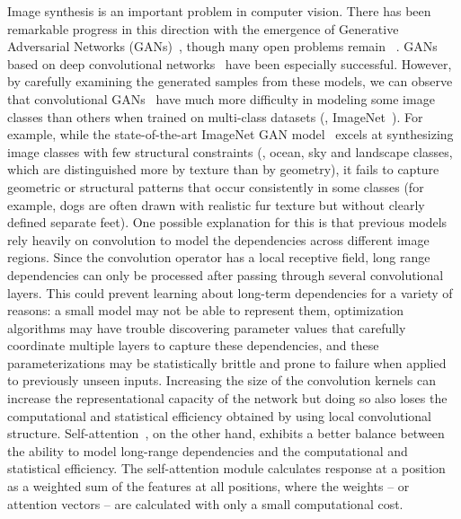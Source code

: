 \documentclass{article}
\begin{document}
Image synthesis is an important problem in computer vision. There has been remarkable progress in this direction with the emergence of Generative Adversarial Networks (GANs)~\cite{goodfellow2014generative}, though many open problems remain ~\cite{OPENPROBLEMS}. GANs based on deep convolutional networks~\cite{Radford15,KarrasALL18,Han17stackgan2} have been especially successful. However, by carefully examining the generated samples from these models, we can observe that convolutional GANs~\cite{Odena2016,Miyato18a, Miyato18b} have much more difficulty in modeling some image classes than others when trained on multi-class datasets (\eg, ImageNet~\cite{ILSVRC15}). For example, while the state-of-the-art ImageNet GAN model~\cite{Miyato18b} excels at synthesizing image classes with few structural constraints (\eg, ocean, sky and landscape classes, which are distinguished more by texture than by geometry), it fails to capture geometric or structural patterns that occur consistently in some classes (for example, dogs are often drawn with realistic fur texture but without clearly defined separate feet). One possible explanation for this is that previous models rely heavily on convolution to model the dependencies across different image regions. Since the convolution operator has a local receptive field, long range dependencies can only be processed after passing through several convolutional layers. This could prevent learning about long-term dependencies for a variety of reasons: a small model may not be able to represent them, optimization algorithms may have trouble discovering parameter values that carefully coordinate multiple layers to capture these dependencies, and these parameterizations may be statistically brittle and prone to failure when applied to previously unseen inputs. Increasing the size of the convolution kernels can increase the representational capacity of the network but doing so also loses the computational and statistical efficiency obtained by using local convolutional structure. Self-attention~\cite{Cheng16,ParikhT0U16, Ashish17}, on the other hand, exhibits a better balance between the ability to model long-range dependencies and the computational and statistical efficiency. The self-attention module calculates response at a position as a weighted sum of the features at all positions, where the weights -- or attention vectors -- are calculated with only a small computational cost.
\end{document}
